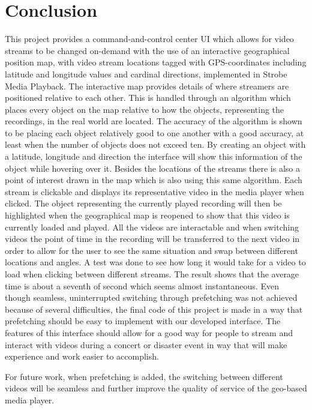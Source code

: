 \chapter{Conclusion}
\label{cha:conclusion}

This project provides a command-and-control center UI which allows for video streams to be changed on-demand with the use of an interactive geographical position map, with video stream locations tagged with GPS-coordinates including latitude and longitude values and cardinal directions, implemented in Strobe Media Playback. The interactive map provides details of where streamers are positioned relative to each other. This is handled through an algorithm which places every object on the map relative to how the objects, representing the recordings, in the real world are located. The accuracy of the algorithm is shown to be placing each object relatively good to one another with a good accuracy, at least when the number of objects does not exceed ten. By creating an object with a latitude, longitude and direction the interface will show this information of the object while hovering over it. Besides the locations of the streams there is also a point of interest drawn in the map which is also using this same algorithm. Each stream is clickable and displays its representative video in the media player when clicked. The object representing the currently played recording will then be highlighted when the geographical map is reopened to show that this video is currently loaded and played. All the videos are interactable and when switching videos the point of time in the recording will be transferred to the next video in order to allow for the user to see the same situation and swap between different locations and angles. A test was done to see how long it would take for a video to load when clicking between different streams. The result shows that the average time is about a seventh of second which seems almost instantaneous. Even though seamless, uninterrupted switching through prefetching was not achieved because of several difficulties, the final code of this project is made in a way that prefetching should be easy to implement with our developed interface. The features of this interface should allow for a good way for people to stream and interact with videos during a concert or disaster event in way that will make experience and work easier to accomplish. 

For future work, when prefetching is added, the switching between different videos will be seamless and further improve the quality of service of the geo-based media player.
